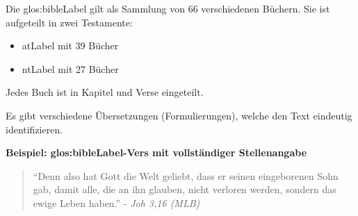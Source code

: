 Die \gls{glos:bibleLabel} gilt als Sammlung von 66 verschiedenen Büchern.
Sie ist aufgeteilt in zwei Testamente:
\begin{itemize}
	\item \gls{atLabel} mit 39 Bücher
	\item \gls{ntLabel} mit 27 Bücher
\end{itemize}
Jedes Buch ist in Kapitel und Verse eingeteilt.

Es gibt verschiedene Übersetzungen (Formulierungen), welche den Text eindeutig identifizieren.


\begin{framed}
	\textbf{Beispiel: \gls{glos:bibleLabel}-Vers mit vollständiger Stellenangabe}
	\begin{quote}
		"`Denn also hat Gott die Welt geliebt, dass er seinen eingeborenen Sohn gab, damit alle, die an ihn glauben, nicht verloren werden, sondern das ewige Leben haben."' - \textit{Joh 3,16 (MLB)\footnotemark}
	\end{quote}
\end{framed}
